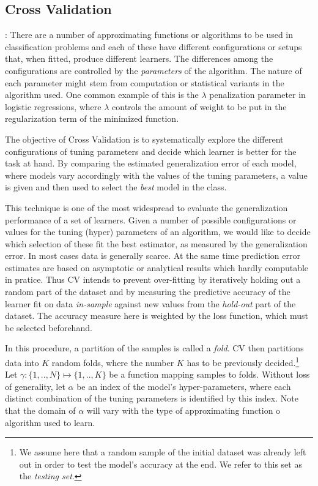 \subsection{Cross Validation}:  
 There are a number of approximating functions or algorithms to be used in classification problems and each of these have different configurations or setups that, when fitted, produce different learners. The differences among the configurations are controlled by the \textit{parameters} of the algorithm. The nature of each parameter might stem from computation or statistical variants in the algorithm used. One common example of this is the $\lambda$ penalization parameter in logistic regressions, where $\lambda$ controls the amount of weight to be put in the regularization term of the minimized function. 

The objective of Cross Validation is to systematically explore the different configurations of tuning parameters and decide which learner is better for the task at hand. By comparing the estimated generalization error of each model, where models vary accordingly with the values of the tuning parameters, a value is given and then used to select the \textit{best} model in the class. 

This technique is one of the most widespread to evaluate the generalization performance of a set of learners. Given a number of possible configurations or values for the tuning (hyper) parameters of an algorithm, we would like to decide which selection of these fit the best estimator, as measured by the generalization error. In most cases data is generally scarce. At the same time prediction error estimates are based on asymptotic or analytical results which hardly computable in pratice. Thus CV intends to prevent over-fitting by iteratively holding out a random part of the dataset and by measuring the predictive accuracy of the learner fit on data \textit{in-sample} against new values from the \textit{hold-out} part of the dataset. The accuracy measure here is weighted by the loss function, which must be selected beforehand. 
 
In this procedure, a partition of the samples is called a \textit{fold}. CV then partitions data into $K$ random folds, where the number $K$ has to be previously decided.\footnote{ We assume here that a random sample of the initial dataset was already left out in order to test the model's accuracy at the end. We refer to this set as the \textit{testing set}.} Let $\gamma : \{1,..,N\} \mapsto \{1, .., K\}$ be a function mapping samples to folds. Without loss of generality,  let $\alpha$ be an index of the model's hyper-parameters, where each distinct combination of the tuning parameters is identified by this index. Note that the domain of $\alpha$ will vary with the type of approximating function o algorithm used to learn.
 

